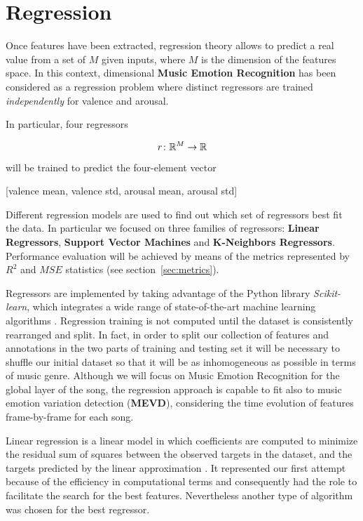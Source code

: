 \section{Regression}\label{sec:regression}

Once features have been extracted, regression theory allows to predict a real value from a set of $M$ given inputs, where $M$ is the dimension of the features space.
In this context, dimensional \textbf{Music Emotion Recognition} has been considered as a regression problem where distinct regressors are trained \textit{independently} for valence and arousal. 

In particular, four regressors

\[
	r \colon \mathbb{R}^{M} \to \mathbb{R}
\]

will be trained to predict the four-element vector

\begin{center}
	[valence mean, valence std, arousal mean, arousal std]
\end{center}

Different regression models are used to find out which set of regressors best fit the data. In particular we focused on three families of regressors: \textbf{Linear Regressors}, \textbf{Support Vector Machines} and \textbf{K-Neighbors Regressors}. Performance evaluation will be achieved by means of the metrics represented by $R^2$ and $MSE$ statistics (see section~\ref{sec:metrics}).

Regressors are implemented by taking advantage of the Python library \textit{Scikit-learn}, which integrates a wide range of state-of-the-art machine learning algorithms \cite{scikit-learn}.
Regression training is not computed until the dataset is consistently rearranged and split. In fact, in order to split our collection of features and annotations in the two parts of training and testing set it will be necessary to shuffle our initial dataset so that it will be as inhomogeneous as possible in terms of music genre. 
Although we will focus on Music Emotion Recognition for the global layer of the song, the regression approach is capable to fit also to music emotion variation detection (\textbf{MEVD}), considering the time evolution of features frame-by-frame for each song.

Linear regression is a linear model in which coefficients are computed to minimize the residual sum of squares between the observed targets in the dataset, and the targets predicted by the linear approximation \cite{scikit-learn}.
It represented our first attempt because of the efficiency in computational terms and consequently had the role to facilitate the search for the best features. Nevertheless another type of algorithm was chosen for the best regressor. 

